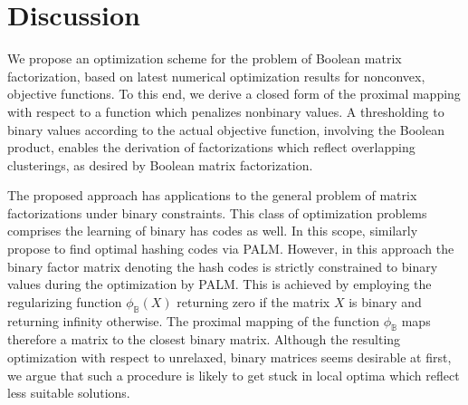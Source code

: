 \section{Discussion}
We propose an optimization scheme for the problem of Boolean matrix factorization, based on latest numerical optimization results for nonconvex, objective functions. To this end, we derive a closed form of the proximal mapping with respect to a function which penalizes nonbinary values. A thresholding to binary values according to the actual objective function, involving the Boolean product, enables the derivation of factorizations which reflect overlapping clusterings, as desired by Boolean matrix factorization.

The proposed approach has applications to the general problem of matrix factorizations under binary constraints. This class of optimization problems comprises the learning of binary has codes as well. In this scope, \cite{shen2016fast} similarly propose to find optimal hashing codes via PALM. However, in this approach the binary factor matrix denoting the hash codes is strictly constrained to binary values during the optimization by PALM. This is achieved by employing the regularizing function $\phi_\mathbb{B}(X)$ returning zero if the matrix $X$ is binary and returning infinity otherwise. The proximal mapping of the function $\phi_\mathbb{B}$ maps therefore a matrix to the closest binary matrix. Although the resulting optimization with respect to unrelaxed, binary matrices seems desirable at first, we argue that such a procedure is likely to get stuck in local optima which reflect less suitable solutions.  